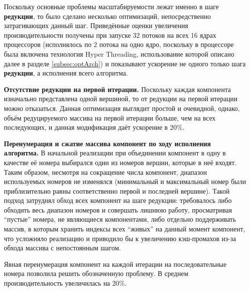 \documentclass[a4paper,12pt]{extarticle}
\begin{document}
Поскольку основные проблемы масштабируемости лежат именно в шаге \textbf{редукции}, то было сделано несколько оптимизаций, непосредственно затрагивающих данный шаг. 
Приведённые оценки увеличения производительности получены при запуске 32 потоков на всех 16 ядрах процессоров (исполнялось по 2 потока на одно ядро, поскольку в процессоре была включена технология Hyper Threading, использование которой описано далее в разделе \ref{subsec:optArch}) и показывают ускорение не одного только шага \textbf{редукции}, а исполнения всего алгоритма.

\textbf{Отсутствие редукции на первой итерации.}
Поскольку каждая компонента изначально представлена одной вершиной, то от редукции на первой итерации можно отказаться. Данная оптимизация выглядит простой и очевидной, однако, объём редуцируемого массива на первой итерации больше, чем на всех последующих, и данная модификация даёт ускорение в 20\%.

\textbf{Перенумерация и сжатие массива компонент по ходу исполнения алгоритма.}
В начальной реализации при объединении компонент в одну в качестве её номера выбирался один из номеров вершин, которые в неё входят. Таким образом, несмотря на сокращение числа компонент, диапазон используемых номеров не изменялся (минимальный и максимальный номер были приблизительно равны соответственно первой и последней вершине). Такой подход затруднял обход всех компонент на шаге редукции: требовалось либо обходить весь диапазон номеров и совершать лишнюю работу, просматривая ``пустые'' номера, не являющиеся компонентами, либо отдельно поддерживать массив, в которым хранить индексы всех ``живых'' на данный момент компонент, что усложняло реализацию и приводило бы к увеличению кэш-промахов из-за обхода массива с непостоянным шагом.

Явная перенумерация компонент на каждой итерации на последовательные номера позволила решить обозначенную проблему. В среднем производительность увеличилась на 20\%.

\end{document}
